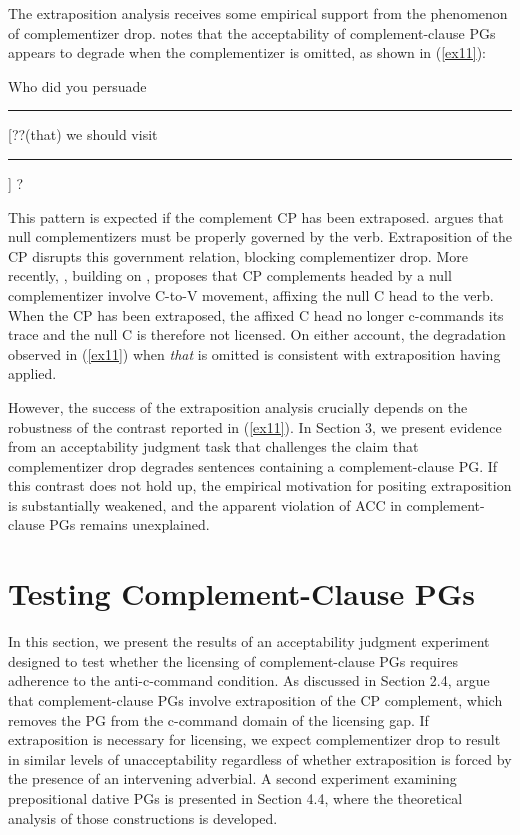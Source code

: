 \documentclass[12pt]{article}
\newcommand{\gap}{\rule{1.25em}{.5pt}} %
\begin{document}
The extraposition analysis receives some empirical support from the phenomenon of complementizer drop. \cite{safir1987} notes that the acceptability of complement-clause PGs appears to degrade when the complementizer is omitted, as shown in (\ref{ex11}):

\ex \label{ex11}
Who did you persuade \gap{} [??(that) we should visit \gap{}] ?
\xe

\noindent
This pattern is expected if the complement CP has been extraposed. \cite{stowell1981} argues that null complementizers must be properly governed by the verb. Extraposition of the CP disrupts this government relation, blocking complementizer drop. More recently, \cite{boskovic2003}, building on \cite{pesetsky1992}, proposes that CP complements headed by a null complementizer involve C-to-V movement, affixing the null C head to the verb. When the CP has been extraposed, the affixed C head no longer c-commands its trace and the null C is therefore not licensed. On either account, the degradation observed in (\ref{ex11}) when \textit{that} is omitted is consistent with extraposition having applied.

However, the success of the extraposition analysis crucially depends on the robustness of the contrast reported in (\ref{ex11}). In Section 3, we present evidence from an acceptability judgment task that challenges the claim that complementizer drop degrades sentences containing a complement-clause PG. If this contrast does not hold up, the empirical motivation for positing extraposition is substantially weakened, and the apparent violation of ACC in complement-clause PGs remains unexplained.

\section{Testing Complement-Clause PGs}

In this section, we present the results of an acceptability judgment experiment designed to test whether the licensing of complement-clause PGs requires adherence to the anti-c-command condition. As discussed in Section 2.4, \cite{arregi2022} argue that complement-clause PGs involve extraposition of the CP complement, which removes the PG from the c-command domain of the licensing gap. If extraposition is necessary for licensing, we expect complementizer drop to result in similar levels of unacceptability regardless of whether extraposition is forced by the presence of an intervening adverbial. A second experiment examining prepositional dative PGs is presented in Section 4.4, where the theoretical analysis of those constructions is developed.
\end{document}
